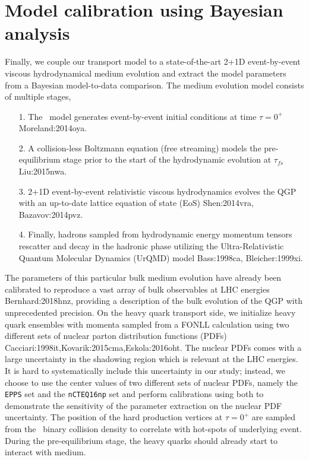 \section{Model calibration using Bayesian analysis}\label{section:calibration}
Finally, we couple our transport model to a state-of-the-art 2+1D event-by-event viscous hydrodynamical medium evolution and extract the model parameters from a Bayesian model-to-data comparison.
The medium evolution model consists of multiple stages,
\begin{itemize}
\item[1.] The \trento\ model generates event-by-event initial conditions at time $\tau = 0^+$ {Moreland:2014oya}. 
\item[2.] A collision-less Boltzmann equation (free streaming) models the pre-equilibrium stage prior to the start of the hydrodynamic evolution at $\tau_{fs}$ {Liu:2015nwa}.
\item[3.] 2+1D event-by-event relativistic viscous hydrodynamics evolves the QGP with an up-to-date lattice equation of state (EoS) {Shen:2014vra, Bazavov:2014pvz}.
\item[4.] Finally, hadrons sampled from hydrodynamic energy momentum tensors rescatter and decay in the hadronic phase utilizing the Ultra-Relativistic Quantum Molecular Dynamics (UrQMD) model {Bass:1998ca, Bleicher:1999xi}.
\end{itemize}
The parameters of this particular bulk medium evolution have already been calibrated to reproduce a vast array of bulk observables at LHC energies {Bernhard:2018hnz}, providing a description of the bulk evolution of the QGP with unprecedented precision.
On the heavy quark transport side, we initialize heavy quark ensembles with momenta sampled from a FONLL calculation using two different sets of nuclear parton distribution functions (PDFs) {Cacciari:1998it,Kovarik:2015cma,Eskola:2016oht}. 
The nuclear PDFs comes with a large uncertainty in the shadowing region which is relevant at the LHC energies.
It is hard to systematically include this uncertainty in our study; instead, we choose to use the center values of two different sets of nuclear PDFs, namely the {\tt EPPS} set and the {\tt nCTEQ16np} set and perform calibrations using both to demonstrate the sensitivity of the parameter extraction on the nuclear PDF uncertainty.
The position of the hard production vertices at $\tau = 0^+$ are sampled from the \trento\ binary collision density to correlate with hot-spots of  underlying event. 
During the pre-equilibrium stage, the heavy quarks should already start to interact with medium.
